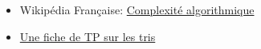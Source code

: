 \begin{itemize}
\itemsep1pt\parskip0pt
\item
  Wikipédia Française:
  \href{http://fr.wikipedia.org/wiki/Complexité_algorithmique}{Complexité
  algorithmique}
\end{itemize}

\begin{itemize}
\itemsep1pt\parskip0pt
\item
  \href{http://www.lri.fr/~denise/M2Spec/97-98.1/TDSpec6.ps}{Une fiche
  de TP sur les tris}
\end{itemize}
